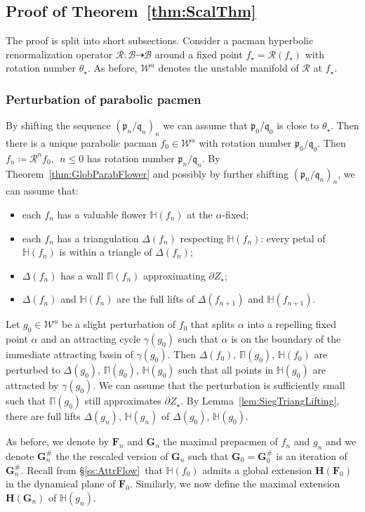 \documentclass[]{amsart}
\renewcommand{\sp}{{\ \ }}
\newcommand{\bDelta}{{\mathbb{\Delta}}}
\newcommand{\bPi}{{\mathbb{\Pi}}}
\newcommand\RR{\mathcal{R}}
\newcommand{\bF}{{\mathbf F}}
\newcommand{\bH}{{\mathbf H}}
\newcommand{\bG}{{\mathbf G}}
\newcommand{\fH}{{\mathbb H}}
\newcommand{\str}{{\star}}
\newcommand{\pp}{\mathfrak{p}}
\renewcommand{\qq}{\mathfrak{q}}
\newcommand\WW{\mathcal{W}}
\newcommand\BB{\mathcal{B}}
\theoremstyle{remark}
\numberwithin{equation}{section}
\theoremstyle{definition}
\begin{document}
\subsection{Proof of Theorem~\ref{thm:ScalThm}}The proof is split into short subsections. Consider a pacman hyperbolic renormalization operator $\RR\colon \BB\dashrightarrow \BB$ around a fixed point $f_\str=\RR(f_\str)$ with rotation number $\theta_\str$.  As before, $\WW^u$ denotes the unstable manifold of $\RR$ at $f_\str$.




\subsubsection{Perturbation of parabolic pacmen}
\label{sss:ScThm:PertParPacm}
By shifting the sequence $(\pp_n/\qq_n)_n$ we can assume that $\pp_0/\qq_0$ is close to $\theta_\str$. Then there is a unique parabolic pacman $f_0\in \WW^u$ with rotation number $\pp_0/\qq_0$. Then $f_n \coloneqq \RR^{n}f_0,\sp n\le 0$ has rotation number $\pp_n/\qq_n$. By Theorem~\ref{thm:GlobParabFlower} and possibly by further shifting $(\pp_n/\qq_n)_n$, we can assume that: 
\begin{itemize}
\item each $f_n$ has a valuable flower $\fH(f_n)$ at the $\alpha$-fixed;
\item each $f_n$ has a triangulation $\bDelta (f_n)$ respecting $\fH(f_n)$: every petal of $\fH(f_n)$ is within a triangle of $\bDelta(f_n)$; 
\item $\bDelta (f_n)$ has a wall $\bPi(f_n)$ approximating $\partial Z_\str$;
\item $\bDelta (f_n)$ and $\fH(f_n)$ are the full lifts of $\bDelta (f_{n+1})$ and $\fH(f_{n+1})$.
\end{itemize}

 Let $g_0\in \WW^u$ be a slight perturbation of $f_0$ that splits $\alpha$ into a repelling fixed point $\alpha$ and an attracting cycle $\gamma(g_0)$ such that $\alpha$ is on the boundary of the immediate attracting basin of $ \gamma(g_0)$. Then $\bDelta (f_0)$, $\bPi(g_0)$, $\fH(f_0)$ are perturbed to $\bDelta (g_0)$, $\bPi(g_0)$, $\fH(g_0)$ such that all points in $\fH(g_0)$ are attracted by $ \gamma(g_0)$. We can assume that the perturbation is sufficiently small such that $\bPi (g_0)$ still approximates $\partial Z_\str$. By Lemma~\ref{lem:SiegTriangLifting}, there are full lifts $\bDelta (g_n)$,  $\fH(g_n)$ of $\bDelta (g_0)$, $\fH(g_0)$.
 
As before, we denote by $\bF_n$ and $\bG_n$ the maximal prepacmen of $f_n$ and $g_n$ and we denote $\bG^\#_n$ the the rescaled version of $\bG_n$ such that $\bG_0=\bG_{0}^{\#}$ is an iteration of $\bG^{\#}_n$. Recall from \S\ref{ss:AttrFlow}~that $\fH(f_0)$ admits a global extension $\bH(\bF_0)$ in the dynamical plane of $\bF_0$. Similarly, we now define the maximal extension $\bH(\bG_n)$ of  $\fH(g_n)$.
\end{document}
